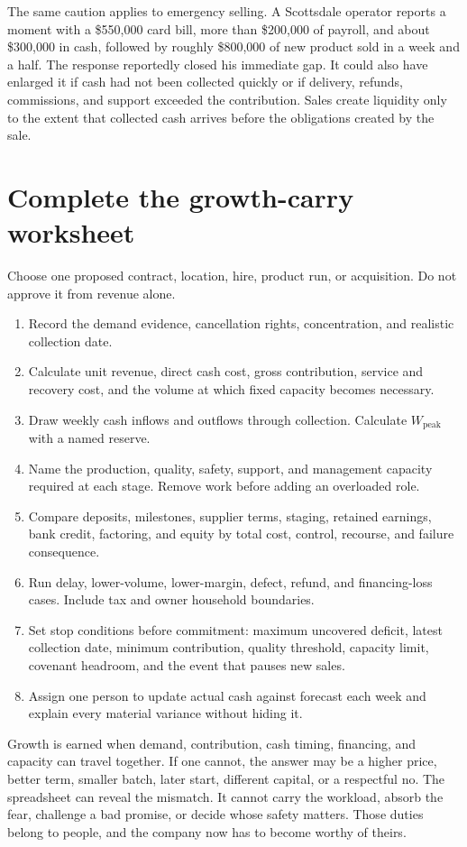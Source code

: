 The same caution applies to emergency selling. A Scottsdale operator reports a
moment with a \$550,000 card bill, more than \$200,000 of payroll, and about
\$300,000 in cash, followed by roughly \$800,000 of new product sold in a week
and a half. The response reportedly closed his immediate gap. It could also
have enlarged it if cash had not been collected quickly or if delivery,
refunds, commissions, and support exceeded the contribution. Sales create
liquidity only to the extent that collected cash arrives before the obligations
created by the sale.

\section{Complete the growth-carry worksheet}

Choose one proposed contract, location, hire, product run, or acquisition. Do
not approve it from revenue alone.

\begin{enumerate}[itemsep=0.18em]
\item Record the demand evidence, cancellation rights, concentration, and
  realistic collection date.
\item Calculate unit revenue, direct cash cost, gross contribution, service and
  recovery cost, and the volume at which fixed capacity becomes necessary.
\item Draw weekly cash inflows and outflows through collection. Calculate
  \(W_{\mathrm{peak}}\) with a named reserve.
\item Name the production, quality, safety, support, and management capacity
  required at each stage. Remove work before adding an overloaded role.
\item Compare deposits, milestones, supplier terms, staging, retained earnings,
  bank credit, factoring, and equity by total cost, control, recourse, and
  failure consequence.
\item Run delay, lower-volume, lower-margin, defect, refund, and financing-loss
  cases. Include tax and owner household boundaries.
\item Set stop conditions before commitment: maximum uncovered deficit, latest
  collection date, minimum contribution, quality threshold, capacity limit,
  covenant headroom, and the event that pauses new sales.
\item Assign one person to update actual cash against forecast each week and
  explain every material variance without hiding it.
\end{enumerate}

Growth is earned when demand, contribution, cash timing, financing, and
capacity can travel together. If one cannot, the answer may be a higher price,
better term, smaller batch, later start, different capital, or a respectful no.
The spreadsheet can reveal the mismatch. It cannot carry the workload, absorb
the fear, challenge a bad promise, or decide whose safety matters. Those duties
belong to people, and the company now has to become worthy of theirs.

